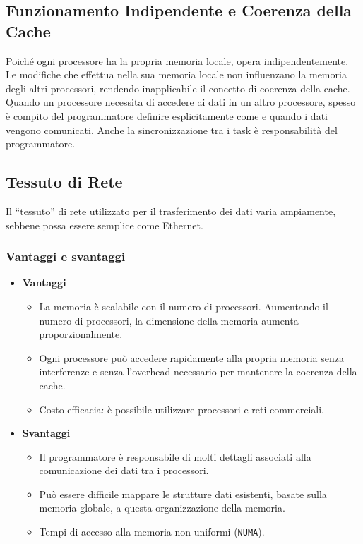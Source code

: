 \subsection{Funzionamento Indipendente e Coerenza della Cache}
Poiché ogni processore ha la propria memoria locale, opera indipendentemente.
Le modifiche che effettua nella sua memoria locale non influenzano la memoria
degli altri processori, rendendo inapplicabile il concetto di coerenza della cache.
Quando un processore necessita di accedere ai dati in un altro processore, spesso
è compito del programmatore definire esplicitamente come e quando i dati vengono
comunicati. Anche la sincronizzazione tra i task è responsabilità del programmatore.

\subsection{Tessuto di Rete}
Il ``tessuto'' di rete utilizzato per il trasferimento dei dati varia ampiamente,
sebbene possa essere semplice come Ethernet.
\subsubsection{Vantaggi e svantaggi}
\begin{itemize}
    \item \textbf{Vantaggi} 
    \begin{itemize}
        \item La memoria è scalabile con il numero di processori. Aumentando
        il numero di processori, la dimensione della memoria aumenta proporzionalmente.
        \item Ogni processore può accedere rapidamente alla propria memoria senza
        interferenze e senza l'overhead necessario per mantenere la coerenza della
        cache.
        \item Costo-efficacia: è possibile utilizzare processori e reti commerciali.
    \end{itemize}
    \item \textbf{Svantaggi}
    \begin{itemize}
        \item Il programmatore è responsabile di molti dettagli associati alla
        comunicazione dei dati tra i processori.
        \item Può essere difficile mappare le strutture dati esistenti, basate
        sulla memoria globale, a questa organizzazione della memoria.
        \item Tempi di accesso alla memoria non uniformi (\texttt{NUMA}).
    \end{itemize}
\end{itemize}
